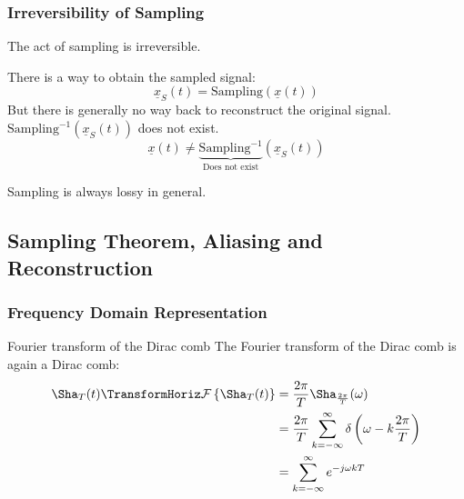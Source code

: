 \begin{refsection}
\subsubsection{Irreversibility of Sampling}

\begin{fact}
	The act of sampling is irreversible.
\end{fact}
	
There is a way to obtain the sampled signal:
\begin{equation*}
	\underline{x}_S(t) = \mathrm{Sampling} \left(\underline{x}(t)\right)
\end{equation*}
But there is generally no way back to reconstruct the original signal. $\mathrm{Sampling}^{-1} \left(\underline{x}_S(t)\right)$ does not exist.
\begin{equation*}
	\underline{x}(t) \neq \underbrace{\mathrm{Sampling}^{-1}}_{\text{Does not exist}} \left(\underline{x}_S(t)\right)
\end{equation*}

Sampling is always lossy in general.

\subsection{Sampling Theorem, Aliasing and Reconstruction}

\subsubsection{Frequency Domain Representation}

\begin{excursus}{Fourier transform of the Dirac comb}
	The Fourier transform of the Dirac comb is again a Dirac comb:
	\begin{equation}
		\begin{split}
			\Sha_{T}(t) \TransformHoriz \mathcal{F}\left\{\Sha_{T}(t)\right\} &= \frac{2 \pi}{T} \Sha_{\frac{2 \pi}{T}}(\omega) \\
			 &= \frac{2 \pi}{T} \sum\limits_{k = -\infty}^{\infty} \delta\left(\omega - k \frac{2 \pi}{T}\right) \\
			 &= \sum\limits_{k = -\infty}^{\infty} e^{- j \omega k T}
		\end{split}
		\label{eq:ch04:dirac_comb_fourier_tranform}
	\end{equation}
\end{excursus}


\end{refsection}
